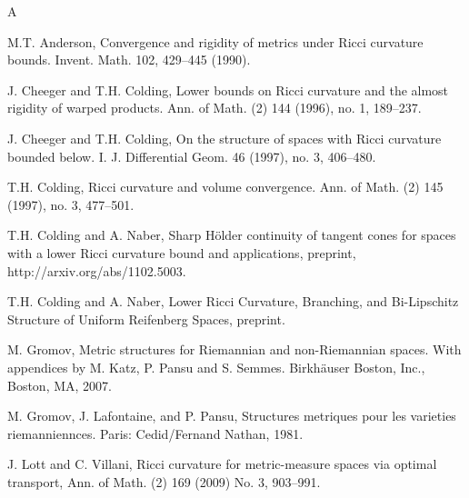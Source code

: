 \documentclass[11pt]{article}
\newcommand{\Ric}{\text{Ric}}
\newcommand{\Vol}{\text{Vol}}
\begin{document}



\begin{thebibliography}{A}

M.T. Anderson,
Convergence and rigidity of metrics under Ricci
curvature bounds. Invent. Math. 102, 429--445 (1990).

J. Cheeger and T.H. Colding,
Lower bounds on Ricci curvature and the
almost rigidity of warped products.  Ann. of Math. (2)  144  (1996),
no. 1, 189--237.

J. Cheeger and T.H. Colding,
On the structure of spaces with Ricci curvature
bounded below. I.  J. Differential Geom.  46  (1997),  no. 3, 406--480.

T.H. Colding,
Ricci curvature and volume convergence.
Ann. of Math. (2)  145  (1997),  no. 3, 477--501.

T.H. Colding and A. Naber, 
Sharp H\"older continuity of tangent cones for spaces with a lower Ricci curvature bound and applications, 
preprint, http://arxiv.org/abs/1102.5003.

T.H. Colding and A. Naber, 
Lower Ricci Curvature, Branching, and Bi-Lipschitz Structure of Uniform Reifenberg Spaces, preprint.

M. Gromov,
Metric structures for Riemannian and non-Riemannian spaces.
With appendices by M. Katz, P. Pansu and S. Semmes.  Birkh\"auser Boston, Inc., Boston, MA, 2007.

M. Gromov, J. Lafontaine, and P. Pansu,
Structures metriques pour les varieties riemanniennces.
Paris: Cedid/Fernand Nathan, 1981.

 J. Lott and C. Villani,
 Ricci curvature for metric-measure spaces via optimal transport,
 Ann. of Math. (2) 169 (2009) No. 3, 903--991.


\end{thebibliography}
\end{document}

